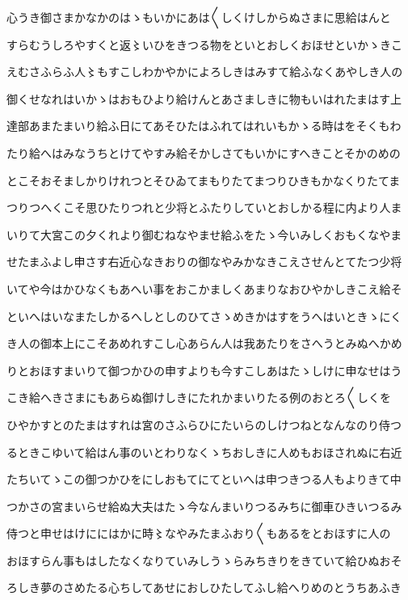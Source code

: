 \documentclass[a4paper,11pt,landscape]{ltjtarticle}
\begin{document}
心うき御さまかなかのはゝもいかにあは〱しくけしからぬさまに思給はんと
\par\medskip
すらむうしろやすくと返〻いひをきつる物をといとおしくおほせといかゝきこ
\par\medskip
えむさふらふ人〻もすこしわかやかによろしきはみすて給ふなくあやしき人の
\par\medskip
御くせなれはいかゝはおもひより給けんとあさましきに物もいはれたまはす上
\par\medskip
達部あまたまいり給ふ日にてあそひたはふれてはれいもかゝる時はをそくもわ
\par\medskip
たり給へはみなうちとけてやすみ給そかしさてもいかにすへきことそかのめの
\par\medskip
とこそおそましかりけれつとそひゐてまもりたてまつりひきもかなくりたてま
\par\medskip
つりつへくこそ思ひたりつれと少将とふたりしていとおしかる程に内より人ま
\par\medskip
いりて大宮この夕くれより御むねなやませ給ふをたゝ今いみしくおもくなやま
\par\medskip
せたまふよし申さす右近心なきおりの御なやみかなきこえさせんとてたつ少将
\par\medskip
いてや今はかひなくもあへい事をおこかましくあまりなおひやかしきこえ給そ
\par\medskip
といへはいなまたしかるへしとしのひてさゝめきかはすをうへはいときゝにく
\par\medskip
き人の御本上にこそあめれすこし心あらん人は我あたりをさへうとみぬへかめ
\par\medskip
りとおほすまいりて御つかひの申すよりも今すこしあはたゝしけに申なせはう
\par\medskip
こき給へきさまにもあらぬ御けしきにたれかまいりたる例のおとろ〱しくを
\par\medskip
ひやかすとのたまはすれは宮のさふらひにたいらのしけつねとなんなのり侍つ
\par\medskip
るときこゆいて給はん事のいとわりなくゝちおしきに人めもおほされぬに右近
\par\medskip
たちいてゝこの御つかひをにしおもてにてといへは申つきつる人もよりきて中
\par\medskip
つかさの宮まいらせ給ぬ大夫はたゝ今なんまいりつるみちに御車ひきいつるみ
\par\medskip
侍つと申せはけににはかに時〻なやみたまふおり〱もあるをとおほすに人の
\par\medskip
おほすらん事もはしたなくなりていみしうゝらみちきりをきていて給ひぬおそ
\par\medskip
ろしき夢のさめたる心ちしてあせにおしひたしてふし給へりめのとうちあふき
\end{document}
